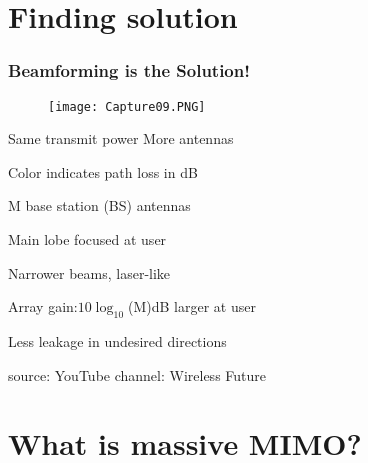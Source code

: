 \documentclass{beamer}
\begin{document}
\section{Finding solution}

\begin{frame}[t,fragile=singleslide]\frametitle{Beamforming is the Solution!}
\begin{figure}
  \texttt{[image: Capture09.PNG]}
\end{figure}
Same transmit power \hspace{1.7cm}        More antennas


\vspace{0.35cm}
\begin{itemize}
	\begin{minipage}{0.49\linewidth}
        \item \footnotesize Color indicates path loss in dB
        \item \footnotesize M base station (BS) antennas
        \item \footnotesize Main lobe focused at user
    \end{minipage}
    \begin{minipage}{0.49\linewidth}
        \item \footnotesize Narrower beams, laser-like
        \item \scriptsize Array gain:$ 10\log_{10}$(M)dB larger at user
        \item \footnotesize Less leakage in undesired directions
   \end{minipage}
\end{itemize}

\vspace{0.65cm}
\centerline{\tiny source: YouTube channel: Wireless Future}
\end{frame}

\section{What is massive MIMO?}
\end{document}
